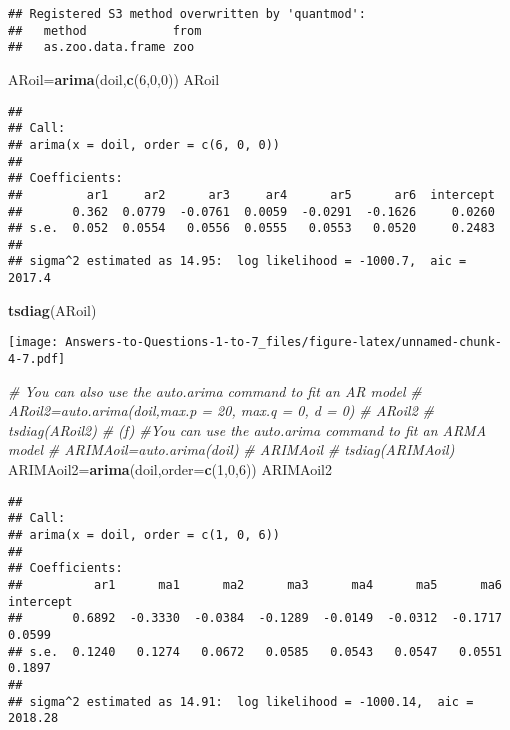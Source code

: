 \documentclass[
]{article}
\newenvironment{Shaded}{\begin{snugshade}}{\end{snugshade}}
\newcommand{\AttributeTok}[1]{\textcolor[rgb]{0.13,0.29,0.53}{#1}}
\newcommand{\CommentTok}[1]{\textcolor[rgb]{0.56,0.35,0.01}{\textit{#1}}}
\newcommand{\DecValTok}[1]{\textcolor[rgb]{0.00,0.00,0.81}{#1}}
\newcommand{\FunctionTok}[1]{\textcolor[rgb]{0.13,0.29,0.53}{\textbf{#1}}}
\newcommand{\NormalTok}[1]{#1}
\newcommand{\OtherTok}[1]{\textcolor[rgb]{0.56,0.35,0.01}{#1}}
\begin{document}
\begin{verbatim}
## Registered S3 method overwritten by 'quantmod':
##   method            from
##   as.zoo.data.frame zoo
\end{verbatim}

\begin{Shaded}
\begin{Highlighting}[]
\NormalTok{ARoil}\OtherTok{=}\FunctionTok{arima}\NormalTok{(doil,}\FunctionTok{c}\NormalTok{(}\DecValTok{6}\NormalTok{,}\DecValTok{0}\NormalTok{,}\DecValTok{0}\NormalTok{))}
\NormalTok{ARoil}
\end{Highlighting}
\end{Shaded}

\begin{verbatim}
## 
## Call:
## arima(x = doil, order = c(6, 0, 0))
## 
## Coefficients:
##         ar1     ar2      ar3     ar4      ar5      ar6  intercept
##       0.362  0.0779  -0.0761  0.0059  -0.0291  -0.1626     0.0260
## s.e.  0.052  0.0554   0.0556  0.0555   0.0553   0.0520     0.2483
## 
## sigma^2 estimated as 14.95:  log likelihood = -1000.7,  aic = 2017.4
\end{verbatim}

\begin{Shaded}
\begin{Highlighting}[]
\FunctionTok{tsdiag}\NormalTok{(ARoil)}
\end{Highlighting}
\end{Shaded}

\texttt{[image: Answers-to-Questions-1-to-7\_files/figure-latex/unnamed-chunk-4-7.pdf]}

\begin{Shaded}
\begin{Highlighting}[]
\CommentTok{\# You can also use the auto.arima command to fit an AR model}
\CommentTok{\# ARoil2=auto.arima(doil,max.p = 20, max.q = 0, d = 0)}
\CommentTok{\# ARoil2}
\CommentTok{\# tsdiag(ARoil2)}
\CommentTok{\# (f)}
\CommentTok{\#You can use the auto.arima command to fit an ARMA model}
\CommentTok{\# ARIMAoil=auto.arima(doil)}
\CommentTok{\# ARIMAoil}
\CommentTok{\# tsdiag(ARIMAoil)}
\NormalTok{ARIMAoil2}\OtherTok{=}\FunctionTok{arima}\NormalTok{(doil,}\AttributeTok{order=}\FunctionTok{c}\NormalTok{(}\DecValTok{1}\NormalTok{,}\DecValTok{0}\NormalTok{,}\DecValTok{6}\NormalTok{))}
\NormalTok{ARIMAoil2}
\end{Highlighting}
\end{Shaded}

\begin{verbatim}
## 
## Call:
## arima(x = doil, order = c(1, 0, 6))
## 
## Coefficients:
##          ar1      ma1      ma2      ma3      ma4      ma5      ma6  intercept
##       0.6892  -0.3330  -0.0384  -0.1289  -0.0149  -0.0312  -0.1717     0.0599
## s.e.  0.1240   0.1274   0.0672   0.0585   0.0543   0.0547   0.0551     0.1897
## 
## sigma^2 estimated as 14.91:  log likelihood = -1000.14,  aic = 2018.28
\end{verbatim}
\end{document}
